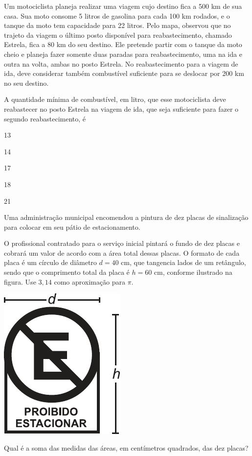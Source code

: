\twocolumn

\questao %
Um motociclista planeja realizar uma viagem cujo
destino fica a 500 km de sua casa. Sua moto consome
5 litros de gasolina para cada 100 km rodados, e o
tanque da moto tem capacidade para 22 litros. Pelo
mapa, observou que no trajeto da viagem o último posto
disponível para reabastecimento, chamado Estrela, fica a
80 km do seu destino. Ele pretende partir com o tanque
da moto cheio e planeja fazer somente duas paradas para
reabastecimento, uma na ida e outra na volta, ambas no
posto Estrela. No reabastecimento para a viagem de ida,
deve considerar também combustível suficiente para se
deslocar por 200 km no seu destino.

A quantidade mínima de combustível, em litro, que
esse motociclista deve reabastecer no posto Estrela na
viagem de ida, que seja suficiente para fazer o segundo
reabastecimento, é

\begin{alternativas}
\item 13
\item 14
\item 17
\item 18
\item 21
\end{alternativas}

\questao
Uma administração municipal encomendou a pintura
de dez placas de sinalização para colocar em seu pátio
de estacionamento.

O profissional contratado para o serviço inicial
pintará o fundo de dez placas e cobrará um valor de
acordo com a área total dessas placas. O formato
de cada placa é um círculo de diâmetro $d = 40$ cm,
que tangencia lados de um retângulo, sendo que
o comprimento total da placa é $h = 60$ cm, conforme
ilustrado na figura. Use $3,14$ como aproximação para $\pi$.

\begin{center}
\includegraphics[width=.2\textwidth]{subareas/matematica/enem_2019-151-desenho.pdf}
\end{center}

Qual é a soma das medidas das áreas, em centímetros
quadrados, das dez placas?

